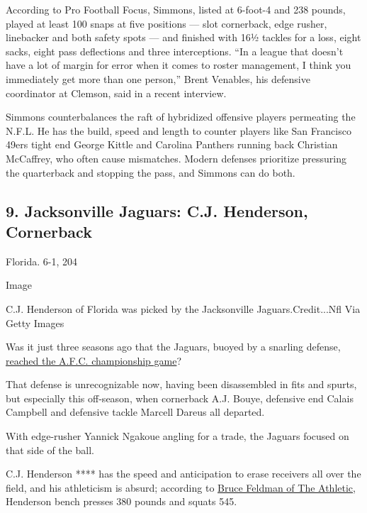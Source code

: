 According to Pro Football Focus, Simmons, listed at 6-foot-4 and 238
pounds, played at least 100 snaps at five positions --- slot cornerback,
edge rusher, linebacker and both safety spots --- and finished with 16½
tackles for a loss, eight sacks, eight pass deflections and three
interceptions. ``In a league that doesn't have a lot of margin for error
when it comes to roster management, I think you immediately get more
than one person,'' Brent Venables, his defensive coordinator at Clemson,
said in a recent interview.

Simmons counterbalances the raft of hybridized offensive players
permeating the N.F.L. He has the build, speed and length to counter
players like San Francisco 49ers tight end George Kittle and Carolina
Panthers running back Christian McCaffrey, who often cause mismatches.
Modern defenses prioritize pressuring the quarterback and stopping the
pass, and Simmons can do both.

\hypertarget{9-jacksonville-jaguars-cj-henderson-cornerback}{%
\subsection{9. Jacksonville Jaguars: C.J. Henderson,
Cornerback}\label{9-jacksonville-jaguars-cj-henderson-cornerback}}

Florida. 6-1, 204

Image

C.J. Henderson of Florida was picked by the Jacksonville
Jaguars.Credit...Nfl Via Getty Images

Was it just three seasons ago that the Jaguars, buoyed by a snarling
defense,
\href{https://www.nytimes3xbfgragh.onion/2018/01/21/sports/afc-championship-patriots-jaguars.html}{reached
the A.F.C. championship game}?

That defense is unrecognizable now, having been disassembled in fits and
spurts, but especially this off-season, when cornerback A.J. Bouye,
defensive end Calais Campbell and defensive tackle Marcell Dareus all
departed.

With edge-rusher Yannick Ngakoue angling for a trade, the Jaguars
focused on that side of the ball.

C.J. Henderson **** has the speed and anticipation to erase receivers
all over the field, and his athleticism is absurd; according to
\href{https://theathletic.com/1065937/2019/07/12/bruce-feldmans-freaks-list-2019-college-football-top-athletic-performances/}{Bruce
Feldman of The Athletic}, Henderson bench presses 380 pounds and squats
545.

